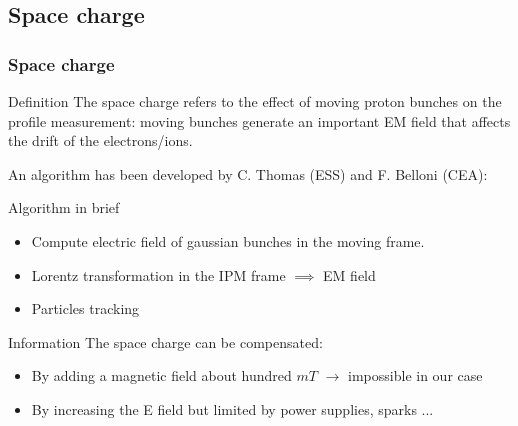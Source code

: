 \subsection{Space charge}
\begin{frame}[t]
  \frametitle{Space charge}
  \begin{block}{Definition}
    The space charge refers to the effect of moving proton bunches on the profile measurement: moving bunches generate an important EM field that affects the drift of the electrons/ions.
  \end{block}
  An algorithm has been developed by C. Thomas (ESS) and F. Belloni (CEA):
  \begin{block}{Algorithm in brief}
    \begin{itemize}
      \item Compute electric field of gaussian bunches in the moving frame.
      \item Lorentz transformation in the IPM frame $\implies$ EM field
      \item Particles tracking
    \end{itemize}
  \end{block}
  \begin{block}{Information}
    The space charge can be compensated:
    \begin{itemize}
      \item By adding a magnetic field about hundred $mT$ $\rightarrow$ impossible in our case
      \item By increasing the E field but limited by power supplies, sparks ...
    \end{itemize}
  \end{block}
\end{frame}

